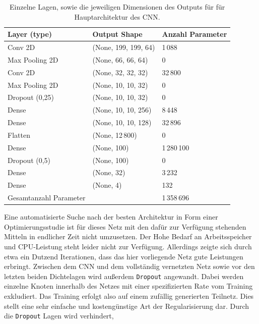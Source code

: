 \begin{table}[htb]
  \centering%
  \begin{tabular}{l
                  l
                  l}
      \toprule
      Layer (type)    & Output Shape     & Anzahl Parameter      \\
      \midrule
      Conv 2D         & (None, 199, 199, 64)  & 1\,088 \\
      Max Pooling 2D  & (None, 66, 66, 64)    & 0 \\
      Conv 2D         & (None, 32, 32, 32)    & 32\,800 \\
      Max Pooling 2D  & (None, 10, 10, 32)    & 0 \\
      Dropout (0,25)  & (None, 10, 10, 32)    & 0 \\
      Dense           & (None, 10, 10, 256)   & 8\,448 \\
      Dense           & (None, 10, 10, 128)   & 32\,896 \\
      Flatten         & (None, 12\,800)         & 0 \\
      Dense           & (None, 100)           & 1\,280\,100 \\
      Dropout (0,5)   & (None, 100)           & 0 \\
      Dense           & (None, 32)            & 3\,232 \\
      Dense           & (None, 4)             & 132 \\
      \midrule
      Gesamtanzahl Parameter &                & 1\,358\,696 \\
      \bottomrule
  \end{tabular}
  \caption{Einzelne Lagen, sowie die jeweiligen Dimensionen des Outputs für für Hauptarchitektur des CNN.}
  \label{tab:haupt}
\end{table}
%
Eine automatisierte Suche nach der besten Architektur in Form einer
Optimierungsstudie ist für dieses Netz mit den dafür zur Verfügung stehenden
Mitteln in endlicher Zeit nicht umzusetzen. Der Hohe Bedarf an Arbeitsspeicher
und CPU-Leistung steht leider nicht zur Verfügung. Allerdings zeigte sich durch
etwa ein Dutzend Iterationen, dass das hier vorliegende Netz gute Leistungen
erbringt. Zwischen dem CNN und dem vollständig vernetzten Netz sowie vor
den letzten beiden Dichtelagen wird außerdem \texttt{Dropout} angewandt.
Dabei werden einzelne Knoten innerhalb des Netzes mit einer spezifizierten Rate
vom Training exkludiert. Das Training erfolgt also auf einem zufällig
generierten Teilnetz. Dies stellt eine sehr einfache und kostengünstige Art
der Regularisierung dar. Durch die \texttt{Dropout} Lagen wird verhindert,

